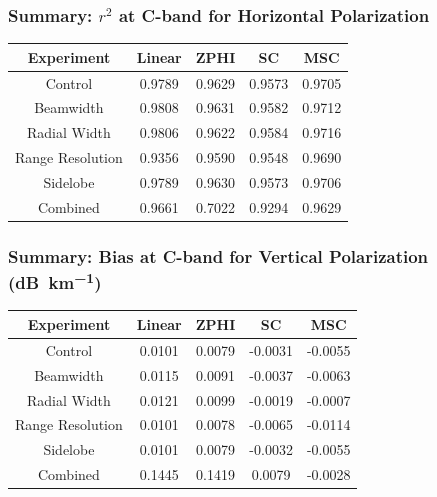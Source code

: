 \documentclass[red]{beamer}
\begin{document}
\begin{frame}
    \frametitle{Summary: $r^2$ at C-band for Horizontal Polarization}
    \begin{center}
        \begin{tabular}{| c | c | c | c | c |}
            \hline
            Experiment & Linear & ZPHI & SC & MSC \\
            \hline
            \hline
            Control & 0.9789 & 0.9629 & 0.9573 & 0.9705 \\
            Beamwidth & 0.9808 & 0.9631 & 0.9582 & 0.9712 \\
            Radial Width & 0.9806 & 0.9622 & 0.9584 & 0.9716 \\
            Range Resolution & 0.9356 & 0.9590 & 0.9548 & 0.9690 \\
            Sidelobe & 0.9789 & 0.9630 & 0.9573 & 0.9706 \\
            Combined & 0.9661 & 0.7022 & 0.9294 & 0.9629 \\
            \hline
        \end{tabular}
    \end{center}
\end{frame}

\begin{frame}
    \frametitle{Summary: Bias at C-band for Vertical Polarization (\si{dB\per \kilo\meter})}
    \begin{center}
        \begin{tabular}{| c | c | c | c | c |}
            \hline
            Experiment & Linear & ZPHI & SC & MSC \\
            \hline
            \hline
            Control & 0.0101 & 0.0079 & -0.0031 & -0.0055 \\
            Beamwidth & 0.0115 & 0.0091 & -0.0037 & -0.0063 \\
            Radial Width & 0.0121 & 0.0099 & -0.0019 & -0.0007 \\
            Range Resolution & 0.0101 & 0.0078 & -0.0065 & -0.0114 \\
            Sidelobe & 0.0101 & 0.0079 & -0.0032 & -0.0055 \\
            Combined & 0.1445 & 0.1419 & 0.0079 & -0.0028 \\
            \hline
        \end{tabular}
    \end{center}
\end{frame}
\end{document}
